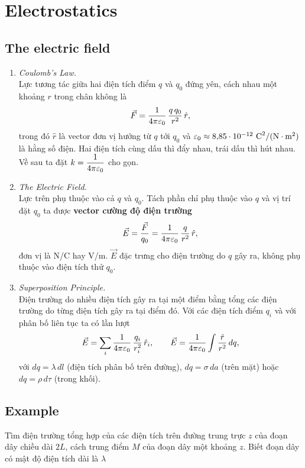 \chapter{Electrostatics}
\section{The electric field}
\begin{enumerate}
\item \textit{Coulomb's Law.}\\
Lực tương tác giữa hai điện tích điểm $q$ và $q_0$ đứng yên, cách nhau một khoảng $r$ trong chân không là
\[
\vec{F} = \frac{1}{4\pi\varepsilon_0}\,\frac{q\,q_0}{r^2}\,\hat{r},
\]
trong đó $\hat{r}$ là vector đơn vị hướng từ $q$ tới $q_0$ và $\ep_0 \approx 8{,}85\cdot 10^{-12}\ \text{C}^2/(\text{N}\cdot\text{m}^2)$ là hằng số điện. Hai điện tích cùng dấu thì đẩy nhau, trái dấu thì hút nhau. Về sau ta đặt $k = \dfrac{1}{4\pi\varepsilon_0}$ cho gọn.

\item \textit{The Electric Field.}\\
Lực trên phụ thuộc vào cả $q$ và $q_0$. Tách phần chỉ phụ thuộc vào $q$ và vị trí đặt $q_0$ ta được \textbf{vector cường độ điện trường}
\[
\vec{E} = \frac{\vec{F}}{q_0} = \frac{1}{4\pi\varepsilon_0}\,\frac{q}{r^2}\,\hat{r},
\]
đơn vị là N/C hay V/m. $\vec{E}$ đặc trưng cho điện trường do $q$ gây ra, không phụ thuộc vào điện tích thử $q_0$.

\item \textit{Superposition Principle.}\\
Điện trường do nhiều điện tích gây ra tại một điểm bằng tổng các điện trường do từng điện tích gây ra tại điểm đó. Với các điện tích điểm $q_i$ và với phân bố liên tục ta có lần lượt
\[
\vec{E} = \sum_i \frac{1}{4\pi\varepsilon_0}\,\frac{q_i}{r_i^2}\,\hat{r}_i,
\qquad
\vec{E} = \frac{1}{4\pi\varepsilon_0}\int \frac{\hat{r}}{r^2}\,dq,
\]
với $dq = \lambda\,dl$ (điện tích phân bố trên đường), $dq = \sigma\,da$ (trên mặt) hoặc $dq = \rho\,d\tau$ (trong khối).
\end{enumerate}

\section{Example}
\begin{problem}
    Tìm điện trường tổng hợp của các điện tích trên đường trung trực $z$ của đoạn dây chiều dài $2L$, cách trung điểm $M$ của đoạn dây một khoảng $z$. Biết đoạn dây có mật độ điện tích dài là $\lambda$
\end{problem}

